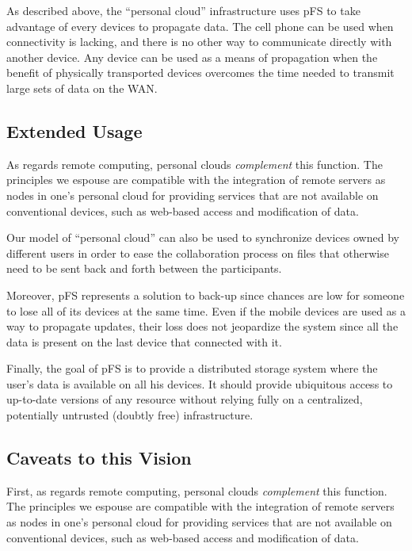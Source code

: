 As described above, the ``personal cloud'' infrastructure uses pFS to 
take advantage of every devices to propagate data. The cell phone can
be used when connectivity is lacking, and there is no other way to
communicate directly with another device. Any device can be used as a
means of propagation when the benefit of physically transported devices
overcomes the time needed to transmit large sets of data on the WAN.
\fi

\subsection{Extended Usage}


As regards remote computing, 
personal clouds \emph{complement} this function. The principles we espouse are
compatible with the integration of remote servers as nodes in one's
personal cloud for providing services that are not available on
conventional devices, such as web-based access and modification of
data.

Our model of ``personal cloud'' can also be used to synchronize
devices owned by different users in order to ease the collaboration
process on files that otherwise need to be sent back and forth between
the participants.

Moreover, pFS represents a solution to back-up since chances are low
for someone to lose all of its devices at the same time. Even if the
mobile devices are used as a way to propagate updates, their loss does not
jeopardize the system since all the data is present on the last device
that connected with it.

Finally, the goal of pFS is to provide a distributed storage system
where the user's data is available on all his devices. It should provide
ubiquitous access to up-to-date versions of any resource without
relying fully on a centralized, potentially untrusted (doubtly
free) infrastructure. 
\fi
\fi

\subsection{Caveats to this Vision}

First, as regards remote computing, personal clouds \emph{complement} this
function. The principles we espouse are compatible with the integration
of remote servers as nodes in one's personal cloud for providing
services that are not available on conventional devices, such as
web-based access and modification of data.

